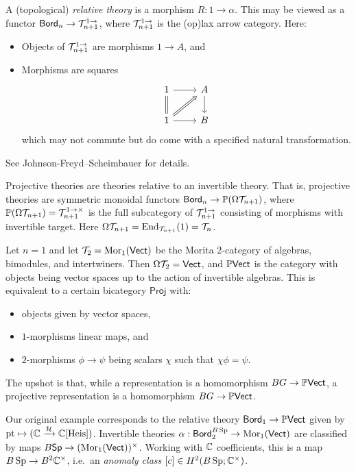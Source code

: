 \documentclass{article}
\begin{document}
A (topological) \emph{relative theory} is a morphism $R: 1 \to \alpha$.
This may be viewed as a functor $\mathsf{Bord}_n \to \mathcal{T}_{n+1}^{1 \to}$, where $\mathcal{T}_{n+1}^{1 \to}$ is the (op)lax arrow category.
Here:
\begin{itemize}
  \item Objects of $\mathcal{T}_{n+1}^{1 \to}$ are morphisms $1 \to A$, and
  \item Morphisms are squares
    \[
      \begin{tikzcd}
        1 \rar \dar[equal] & A \dar \\
        1 \rar \ar[ur, Rightarrow] & B
      \end{tikzcd}
    \]
    which may not commute but do come with a specified natural transformation.
\end{itemize}
See Johnson-Freyd--Scheimbauer for details.

Projective theories are theories relative to an invertible theory.
That is, projective theories are symmetric monoidal functors $\mathsf{Bord}_n \to \mathbb{P}(\Omega \mathcal{T}_{n+1})$,
where $\mathbb{P}(\Omega \mathcal{T}_{n+1}) = \mathcal{T}_{n+1}^{1 \to \times}$ is the full subcategory of $\mathcal{T}_{n+1}^{1 \to}$ consisting of morphisms with invertible target.
Here $\Omega \mathcal{T}_{n+1} = \operatorname{End}_{\mathcal{T}_{n+1}}(1) = \mathcal{T}_n$.

\begin{ex}
  Let $n = 1$ and let $\mathcal{T}_2 = \operatorname{Mor}_1(\mathsf{Vect})$ be the Morita $2$-category of algebras, bimodules, and intertwiners.
  Then $\Omega \mathcal{T}_2 = \mathsf{Vect}$, and $\mathbb{P}\mathsf{Vect}$ is the category with objects being vector spaces up to the action of invertible algebras.
  This is equivalent to a certain bicategory $\mathsf{Proj}$ with:
  \begin{itemize}
    \item objects given by vector spaces,
    \item $1$-morphisms linear maps, and
    \item $2$-morphisms $\phi \to \psi$ being scalars $\chi$ such that $\chi \phi = \psi$.
  \end{itemize}
\end{ex}

The upshot is that, while a representation is a homomorphism $BG \to \mathbb{P}\mathsf{Vect}$, a projective representation is a homomorphism $BG \to \mathbb{P}\mathsf{Vect}$.

\begin{ex}
  Our original example corresponds to the relative theory $\mathsf{Bord}_1 \to \mathbb{P}\mathsf{Vect}$ given by $\operatorname{pt} \mapsto (\mathbb{C} \xrightarrow{\mathcal{H}} \mathbb{C}[\operatorname{Heis}])$.
Invertible theories $\alpha: \mathsf{Bord}_2^{B\operatorname{Sp}} \to \operatorname{Mor}_1(\mathsf{Vect})$ are classified by maps $B\mathsf{Sp} \to (\operatorname{Mor}_1(\mathsf{Vect}))^\times$.
Working with $\mathbb{C}$ coefficients, this is a map $B\operatorname{Sp} \to B^2 \mathbb{C}^\times$, i.e.\ an \emph{anomaly class} $[c] \in H^2(B\operatorname{Sp}; \mathbb{C}^\times)$.
\end{ex}
\end{document}
